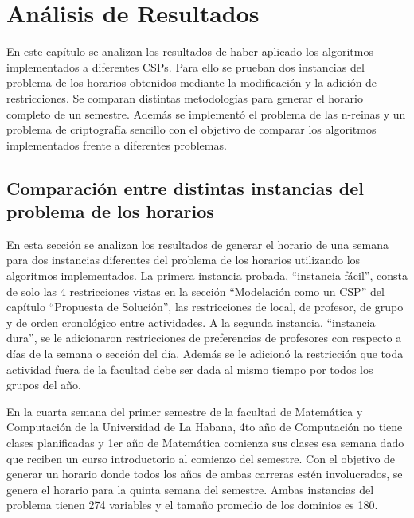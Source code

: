 \chapter{An\'alisis de Resultados}

En este cap\'itulo se analizan los resultados de haber aplicado los algoritmos implementados a diferentes CSPs. Para ello se prueban dos instancias del problema de los horarios obtenidos mediante la modificaci\'on y la adici\'on de restricciones. Se comparan distintas metodolog\'ias para generar el horario completo de un semestre. Adem\'as se implement\'o el problema de las n-reinas y un problema de criptograf\'ia sencillo con el objetivo de comparar los algoritmos implementados frente a diferentes problemas.

\section{Comparaci\'on entre distintas instancias del problema de los horarios}

En esta secci\'on se analizan los resultados de generar el horario de una semana para dos instancias diferentes del problema de los horarios utilizando los algoritmos implementados. La primera instancia probada, ``instancia f\'acil'', consta de solo las 4 restricciones vistas en la secci\'on ``Modelaci\'on como un CSP'' del cap\'itulo ``Propuesta de Solución'', las restricciones de local, de profesor, de grupo y de orden cronol\'ogico entre actividades. A la segunda instancia, ``instancia dura'', se le adicionaron restricciones de preferencias de profesores con respecto a d\'ias de la semana o secci\'on del d\'ia. Adem\'as se le adicion\'o la restricci\'on que toda actividad fuera de la facultad debe ser dada al mismo tiempo por todos los grupos del año.

En la cuarta semana del primer semestre de la facultad de Matem\'atica y Computaci\'on de la Universidad de La Habana, 4to año de Computaci\'on no tiene clases planificadas y 1er año de Matem\'atica comienza sus clases esa semana dado que reciben un curso introductorio al comienzo del semestre. Con el objetivo de generar un horario donde todos los años de ambas carreras est\'en involucrados, se genera el horario para la quinta semana del semestre. Ambas instancias del problema tienen 274 variables y el tamaño promedio de los dominios es 180.

